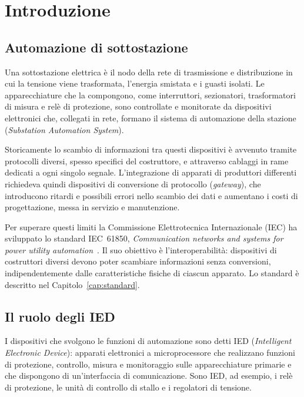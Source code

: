 \documentclass[11pt,a4paper,italian,oneside,openany]{book}
\begin{document}
\frontmatter
\tableofcontents
\mainmatter

\chapter{Introduzione}\label{cap:introduzione}

\section{Automazione di sottostazione}
Una sottostazione elettrica è il nodo della rete di trasmissione e distribuzione in cui la tensione viene trasformata, l'energia smistata e i guasti isolati. Le apparecchiature che la compongono, come interruttori, sezionatori, trasformatori di misura e relè di protezione, sono controllate e monitorate da dispositivi elettronici che, collegati in rete, formano il sistema di automazione della stazione (\textit{Substation Automation System}).

Storicamente lo scambio di informazioni tra questi dispositivi è avvenuto tramite protocolli diversi, spesso specifici del costruttore, e attraverso cablaggi in rame dedicati a ogni singolo segnale. L'integrazione di apparati di produttori differenti richiedeva quindi dispositivi di conversione di protocollo (\textit{gateway}), che introducono ritardi e possibili errori nello scambio dei dati e aumentano i costi di progettazione, messa in servizio e manutenzione.

Per superare questi limiti la Commissione Elettrotecnica Internazionale (IEC) ha sviluppato lo standard IEC~61850, \textit{Communication networks and systems for power utility automation}~\cite{iec61850}. Il suo obiettivo è l'interoperabilità: dispositivi di costruttori diversi devono poter scambiare informazioni senza conversioni, indipendentemente dalle caratteristiche fisiche di ciascun apparato. Lo standard è descritto nel Capitolo~\ref{cap:standard}.

\section{Il ruolo degli IED}
I dispositivi che svolgono le funzioni di automazione sono detti IED (\textit{Intelligent Electronic Device}): apparati elettronici a microprocessore che realizzano funzioni di protezione, controllo, misura e monitoraggio sulle apparecchiature primarie e che dispongono di un'interfaccia di comunicazione. Sono IED, ad esempio, i relè di protezione, le unità di controllo di stallo e i regolatori di tensione.
\end{document}
